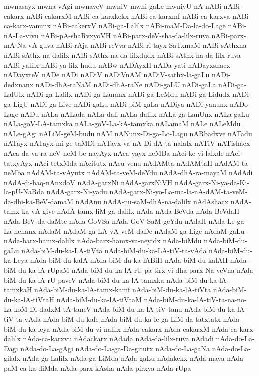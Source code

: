 {mwnasayx
mwna-vAgi
mwnaveV
mwniV
mwni-gaLe
mwniyU
nA
nABi
nABi-cakarx
nABi-cakarxM
nABi-ca-karxkekx
nABi-ca-karxmf
nABi-ca-karxva
nABi-ca-karx-vanunx
nABi-cakerxV
nABi-ga-Lalilx
nABi-maM-Da-la-do-Lage
nABi-nA-La-vivu
nABi-pA-shaRvxyoVH
nABi-parx-deV-sha-da-lilx-ruva
nABi-parx-mA-Na-vA-guva
nABi-rAja
nABi-reVva
nABi-ri-tayx-SaTxmaM
nABi-sAthxna
nABi-sAthx-na-dalilx
nABi-sAthx-na-da-lilxdudx
nABi-sAthx-na-da-lilx-ruva
nABi-yalilx
nABi-ya-lilx-hudu
nABw
nADAyxH
nADa-yati
nADayxshacx
nADayxteV
nADe
nADi
nADiV
nADiVnAM
nADiV-sathx-la-gaLu
nADi-dedxnanx
nADi-dhA-raNaM
nADi-dhA-raNe
nADi-gaLU
nADi-gaLa
nADi-ga-LalUlx
nADi-ga-Lalilx
nADi-ga-Lanunx
nADi-ga-LeMdu
nADi-ga-Lidudx
nADi-ga-LigU
nADi-ga-Live
nADi-gaLu
nADi-piM-gaLa
nADiya
nADi-yanunx
nADo-Lage
nADu
nALa
nALada
nALa-dali
nALa-dalilx
nALa-ga-LanUnx
nALa-gaLu
nALa-goV-LA-tamxka
nALa-goV-La-kA-tamxka
nALamaM
nALe
nALeMdu
nALe-gAgi
nALiM-geM-budu
nAM
nANunx-Di-ga-Lo-Lagu
nARbadxve
nATadu
nATayx
nATayx-mi-ge-taMDi
nATayx-va-nA-Di-dA-ta-nalalx
nATiV
nATishacx
nAca-da-va-ra-neV-neM-be-nayAyx
nAca-yayx-neMBa
nAci-ke-yi-lalxde
nAci-tatxyAyx
nAci-tetxMda
nAcitutx
nAcu-venu
nAdAMta
nAdAMtaH
nAdAM-ta-neMba
nAdAM-ta-vAyutx
nAdAM-ta-veM-deYdu
nAdA-dhA-ra-mayaM
nAdAdi
nAdA-di-haq-nAnxdoV
nAdA-garxNi
nAdA-garxNiVH
nAdA-garx-Ni-ya-da-Ki-la-pU-NaRda
nAdA-garx-Ni-yadu
nAdA-garx-Ni-yo-La-ma-la-nA-dAM-ta-veM-da-dhi-ka-BeV-damaM
nAdAnu
nAdA-nu-saM-dhA-na-dalilx
nAdAshacx
nAdA-tamx-ka-vA-give
nAdA-tamx-liM-ga-dalilx
nAda
nAda-BeVda
nAda-BeVdaH
nAda-BeV-da-daMte
nAda-GoVSa
nAda-GoV-SaM-geYdu
nAdaH
nAda-Le-ga-La-nenanx
nAdaM
nAdaM-ga-LA-vA-veM-daDe
nAdaM-ga-Lige
nAdaM-gaLu
nAda-barx-hamx-dalilx
nAda-barx-hamx-va-neyidx
nAda-biMdu
nAda-biM-du-gaLu
nAda-biM-du-ka-LA-tiVta
nAda-biM-du-ka-LA-tiV-ta-vAda
nAda-biM-du-ka-Leya
nAda-biM-du-kalA
nAda-biM-du-ka-lABiH
nAda-biM-du-kalAH
nAda-biM-du-ka-lA-rUpaM
nAda-biM-du-ka-lA-rU-pa-tirx-vi-dha-parx-Na-veVna
nAda-biM-du-ka-lA-rU-paveV
nAda-biM-du-ka-lA-tamxka
nAda-biM-du-ka-lA-tamxkaH
nAda-biM-du-ka-lA-tamx-kamf
nAda-biM-du-ka-lA-tiVta
nAda-biM-du-ka-lA-tiVtaH
nAda-biM-du-ka-lA-tiVtaM
nAda-biM-du-ka-lA-tiV-ta-na-no-La-koM-Di-dadxM-tA-taneV
nAda-biM-du-ka-lA-tiV-tanu
nAda-biM-du-ka-lA-tiV-ta-vAda
nAda-biM-du-kale
nAda-biM-du-ka-le-ga-LiM-da-tatxtatx
nAda-biM-du-ka-leya
nAda-biM-du-vi-nalilx
nAda-cakarx
nAda-cakarxM
nAda-ca-karx-dalilx
nAda-ca-karxvu
nAdackarx
nAdada
nAda-da-lilx-ruva
nAdadi
nAda-do-La-Dagi
nAda-do-La-gAgi
nAda-do-La-ga-Da-gitutx
nAda-do-La-gaNa
nAda-do-La-gilalx
nAda-ga-Lalilx
nAda-ga-LiMda
nAda-gaLu
nAdakekx
nAda-maya
nAda-paM-ca-ka-diMda
nAda-parx-kAsha
nAda-pirxya
nAda-rUpa
}
